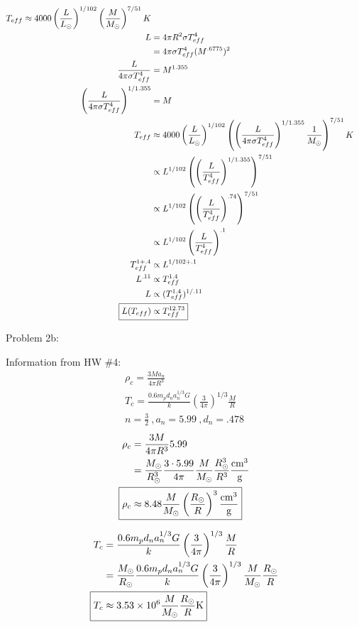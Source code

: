 \documentclass[10pt,letter,preprint]{aastex}
\newcommand{\pt}{\propto}
\begin{document}
\begin{align}
T_{eff} \approx 4000 \left( \frac{L}{L_\odot} \right)^{1/102} \left( \frac{M}{M_\odot} \right)^{7/51} K\\
L & = 4 \pi R^2 \sigma T_{eff}^4\\
&  = 4 \pi \sigma T_{eff}^4 (M^{.6775})^2\\
\frac{L}{4 \pi \sigma T_{eff}^4} & = M^{1.355}\\
\left( \frac{L}{4 \pi \sigma T_{eff}^4} \right)^{1/1.355} & = M\\
T_{eff} & \approx 4000 \left( \frac{L}{L_\odot} \right)^{1/102}  \left( \left( \frac{L}{4 \pi \sigma T_{eff}^4} \right)^{1/1.355} \frac{1}{M_\odot} \right)^{7/51} K \\
& \propto L^{1/102} \left( \left( \frac{L}{T_{eff}^4} \right)^{1/1.355} \right)^{7/51}\\
& \propto L^{1/102} \left( \left( \frac{L}{T_{eff}^4} \right)^{.74} \right)^{7/51}\\
& \propto L^{1/102} \left( \frac{L}{T_{eff}^4} \right)^{.1}\\
T_{eff}^{1+.4} & \pt L^{1/102 + .1}\\
L^{.11} & \pt T_{eff}^{1.4}\\
L & \pt (T_{eff}^{1.4} )^{1/.11}\\
\Aboxed{L(T_{eff}) & \pt T_{eff}^{12.73}}
\end{align}

Problem 2b:

Information from HW \#4:\\

\begin{align}
\rho_c = \frac{3Ma_n}{4\pi R^3}\\
T_c  = \frac{0.6m_pd_na_n^{1/3} G}{k} \left( \frac{3}{4 \pi} \right)^{1/3} \frac{M}{R}\\
n=\frac{3}{2}~, a_n = 5.99~, d_n = .478
\end{align}
\begin{align}
\rho_c & = \frac{3M}{4 \pi R^3}5.99\\
& = \frac{M_\odot}{R_\odot^3} \frac{3 \cdot 5.99}{4 \pi}\frac{M}{M_\odot} \frac{R_\odot^3}{R^3} \frac{\text{cm}^3}{\text{g}}\\
\Aboxed{\rho_c& \approx 8.48 \frac{M}{M_\odot} \left( \frac{R_\odot}{R} \right)^3 \frac{\text{cm}^3}{\text{g}}}
\end{align}

\begin{align}
T_c & = \frac{0.6m_pd_na_n^{1/3} G}{k} \left( \frac{3}{4 \pi} \right)^{1/3} \frac{M}{R}\\
& = \frac{M_\odot}{R_\odot} \frac{0.6m_pd_na_n^{1/3} G}{k} \left( \frac{3}{4 \pi} \right)^{1/3}  \frac{M}{M_\odot} \frac{R_\odot}{R}\\
\Aboxed{T_c & \approx 3.53 \times 10^{6} \frac{M}{M_\odot} \frac{R_\odot}{R} \text{K}}\\
\end{align}
\end{document}
